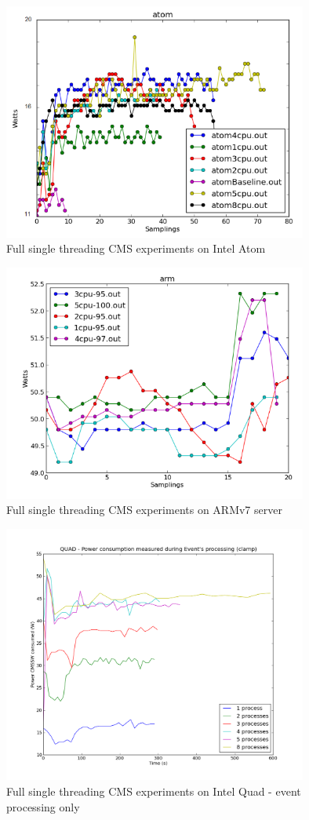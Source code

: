 \begin{figure}[h!]
  \centering
    \includegraphics[width=100mm]{"img/aalto/aalto_total_atom"}
    \caption{Full single threading CMS experiments on Intel Atom}
    \label{fig:aalto_atom_clamp}
\end{figure}

\begin{figure}[h!]
  \centering
    \includegraphics[width=100mm]{"img/aalto/aalto_total_arm"}
    \caption{Full single threading CMS experiments on ARMv7 server}
    \label{fig:aalto_arm_clamp}
\end{figure}


\begin{figure}[h!]
  \centering
    \includegraphics[width=100mm]{"img/aalto/aalto_quadEvents"}
    \caption{Full single threading CMS experiments on Intel Quad - event
    \label{fig:aalto_quad_events}
processing only}
\end{figure}

